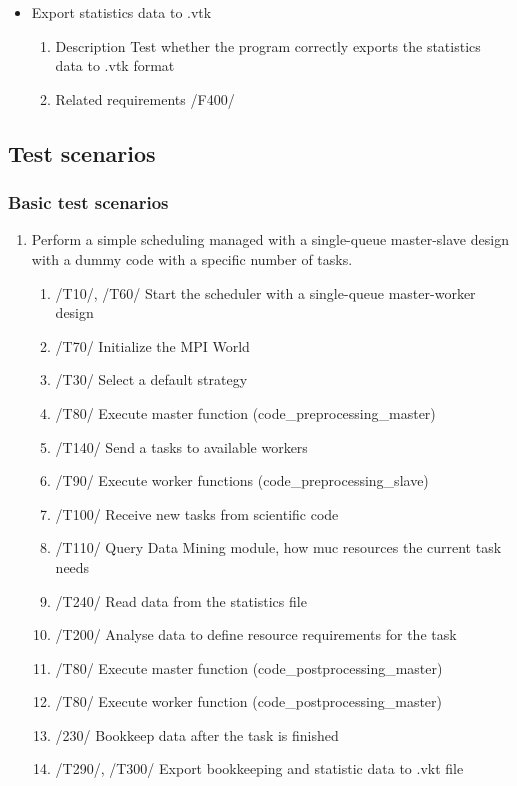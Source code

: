 {\begin{itemize}
		
				\item Export statistics data to .vtk
				\begin{enumerate}
					\item Description\newline
Test whether the program correctly exports the statistics data to .vtk format
					\item Related requirements\newline
					/F400/
				\end{enumerate}
				
		\end{itemize}				
		
		
		\subsection{Test scenarios}
		
		\subsubsection{Basic test scenarios}
		
		\begin{enumerate}
			\item Perform a simple scheduling managed with a single-queue master-slave design with a dummy code with a specific number of tasks.
			\begin{enumerate}
				\item /T10/, /T60/ Start the scheduler with a single-queue master-worker design
				\item /T70/ Initialize the MPI World
				\item /T30/ Select a default strategy
				\item /T80/ Execute master function (code\_preprocessing\_master)
				\item /T140/ Send a tasks to available workers
				\item /T90/ Execute worker functions (code\_preprocessing\_slave)
				\item /T100/ Receive new tasks from scientific code
				\item /T110/ Query Data Mining module, how muc resources the current task needs
				\item /T240/ Read data from the statistics file
				\item /T200/ Analyse data to define resource requirements for the task
				\item /T80/ Execute master function (code\_postprocessing\_master)
				\item /T80/ Execute worker function (code\_postprocessing\_master)
				\item /230/ Bookkeep data after the task is finished
				\item /T290/, /T300/ Export bookkeeping and statistic data to .vkt file
			\end{enumerate}
			

\end{enumerate}}
